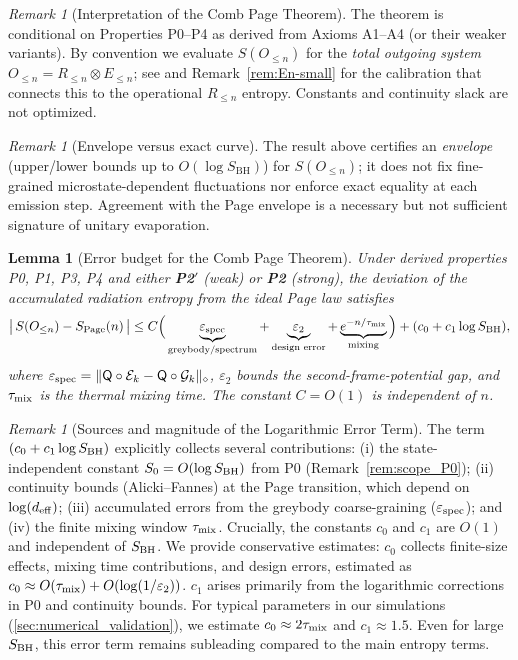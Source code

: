 \documentclass[aps,prd,preprint,onecolumn,superscriptaddress,nofootinbib,longbibliography,floatfix,11pt,showpacs,showkeys]{revtex4-2}
\newcommand{\Ptwo}{\textbf{P2}\xspace}
\newcommand{\PtwoPrime}{\textbf{P2$'$}\xspace}
\newcommand{\SBH}{\ensuremath{S_{\mathrm{BH}}}}
\theoremstyle{plain}
\newtheorem{lemma}[theorem]{Lemma}
\theoremstyle{definition}
\theoremstyle{remark}
\newtheorem{remark}[theorem]{Remark}
\begin{document}
\begin{remark}[Interpretation of the Comb Page Theorem]
The theorem is conditional on Properties P0--P4 as derived from Axioms A1--A4 (or their weaker variants).
By convention we evaluate $S(O_{\le n})$ for the \emph{total outgoing system} $O_{\le n}=R_{\le n}\otimes E_{\le n}$; see  and Remark~\ref{rem:En-small} for the calibration that connects this to the operational $R_{\le n}$ entropy. Constants and continuity slack are not optimized.
\end{remark}

\begin{remark}[Envelope versus exact curve]
The result above certifies an \emph{envelope} (upper/lower bounds up to $O(\log \SBH)$) for $S(O_{\le n})$; it does not fix fine-grained microstate-dependent fluctuations nor enforce exact equality at each emission step. Agreement with the Page envelope is a necessary but not sufficient signature of unitary evaporation.
\end{remark}

\begin{lemma}[Error budget for the Comb Page Theorem]
\label{lem:comb-error-budget}
Under derived properties P0, P1, P3, P4 and either \PtwoPrime{} (weak) or \Ptwo{} (strong),
the deviation of the accumulated radiation entropy from the ideal Page law satisfies
\[
\big|\,S(O_{\le n}) - S_{\rm Page}(n)\,\big|
\le C\Big( \underbrace{\varepsilon_{\rm spec}}_{\text{greybody/spectrum}} 
+ \underbrace{\varepsilon_2}_{\text{design error}}
+ \underbrace{e^{-n/\tau_{\rm mix}}}_{\text{mixing}} \Big)
+ (c_0 + c_1\log S_{\rm BH}),
\]
where $\varepsilon_{\rm spec}=\|\mathsf{Q}\circ \mathcal{E}_k - \mathsf{Q}\circ \mathcal{G}_k\|_\diamond$,
$\varepsilon_2$ bounds the second-frame-potential gap, and $\tau_{\rm mix}$ is the thermal mixing time.
The constant $C=O(1)$ is independent of $n$.
\end{lemma}
\begin{remark}[Sources and magnitude of the Logarithmic Error Term]
\label{rem:log_error_sources}
The term $(c_0 + c_1\log S_{\rm BH})$ explicitly collects several contributions: (i) the state-independent constant $S_0=O(\log S_{\rm BH})$ from P0 (Remark~\ref{rem:scope_P0}); (ii) continuity bounds (Alicki--Fannes) at the Page transition, which depend on $\log(d_{\rm eff})$; (iii) accumulated errors from the greybody coarse-graining ($\varepsilon_{\rm spec}$); and (iv) the finite mixing window $\tau_{\rm mix}$.
Crucially, the constants $c_0$ and $c_1$ are $O(1)$ and independent of $S_{\rm BH}$. We provide conservative estimates: $c_0$ collects finite-size effects, mixing time contributions, and design errors, estimated as $c_0 \approx O(\tau_{\rm mix}) + O(\log(1/\varepsilon_2))$. $c_1$ arises primarily from the logarithmic corrections in P0 and continuity bounds. For typical parameters in our simulations (\cref{sec:numerical_validation}), we estimate $c_0 \approx 2\tau_{\rm mix}$ and $c_1 \approx 1.5$. Even for large $S_{\rm BH}$, this error term remains subleading compared to the main entropy terms.
\end{remark}
\end{document}
